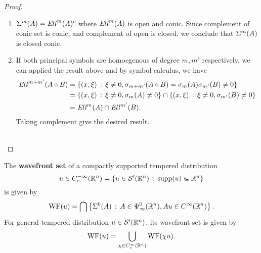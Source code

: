 \documentclass[12pt]{article}
\begin{document}
\begin{proof}
\begin{enumerate}
        \item $\Sigma^m(A) = \mathit{Ell}^m(A)^c$ where $\mathit{Ell}^m(A)$ is open and conic. Since complement of conic set is conic, and complement of open is closed, we conclude that $\Sigma^m(A)$ is closed conic. 
        
        
        \item If both principal symbols are homoegenous of degree $m, m'$ respectively, we can applied the result above and by symbol calculus, we have
        \begin{align*}
            \mathit{Ell}^{m + m'}(A \circ B) 
            & = \left\{(x, \xi) \, : \, \xi \neq 0, \sigma_{m + m'}(A \circ B) = \sigma_m(A) \sigma_{m'}(B) \neq 0\right\}\\
            & = \left\{(x, \xi) \, : \, \xi \neq 0, \sigma_m(A)  \neq 0\right\} \cap  \left\{(x, \xi) \, : \, \xi \neq 0, \sigma_{m'}(B)  \neq 0\right\} \\
            & = \mathit{Ell}^m(A) \cap \mathit{Ell}^{m'}(B). 
        \end{align*}
        Taking complement give the desired result. \\
        \\
    \end{enumerate}
    
\end{proof}




\begin{fdefinition}
    The \textbf{wavefront set} of a compactly supported tempered distribution 
    \[
    u \in C^{-\infty}_c({\mathbb R}^n) = \left\{u \in \mathcal{S}'({\mathbb R}^n) \, : \, \mathrm{supp}(u) \Subset {\ensuremath {\mathbb R}}^n\right\} 
    \]
    is given by 
    \begin{align*}
        \mathrm{WF}(u) = \bigcap \left\{\Sigma^0(A) \, : \, A \in \Psi^0_\infty({\mathbb R}^n), Au \in C^\infty({\mathbb R}^n)\right\}. 
    \end{align*}
    For general tempered distribution $u \in \mathcal{S}'({\mathbb R}^n)$, its wavefront set is given by 
    \begin{align*}
        \mathrm{WF}(u) = \bigcup_{\chi \in C^\infty_c({\mathbb R}^n)} \mathrm{WF}(\chi u). 
    \end{align*}
\end{fdefinition} 
\end{document}
